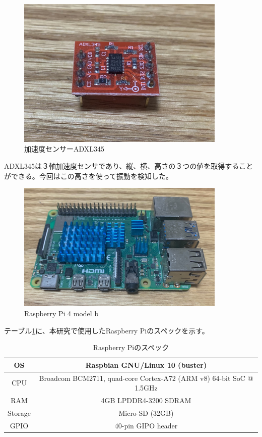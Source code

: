 \begin{figure}[htbp]
  \caption{加速度センサーADXL345}
  \label{fig:adxl345}
  \begin{center}
    \includegraphics[bb=0 0 1300 1000,width=10cm]{assets/adxl345.jpg}
  \end{center}
\end{figure}

ADXL345は３軸加速度センサであり、縦、横、高さの３つの値を取得することができる。今回はこの高さを使って振動を検知した。

\begin{figure}[htbp]
  \caption{Raspberry Pi 4 model b}
  \label{fig:raspi4_model_b}
  \begin{center}
    \includegraphics[bb=0 0 1300 1100,width=10cm]{assets/raspi4_model_b.jpg}
  \end{center}
\end{figure}

テーブル\ref{tb:raspberry_pi_spec}に、本研究で使用したRaspberry Piのスペックを示す。

\begin{table}[htbp]
  \caption{Raspberry Piのスペック}
  \label{tb:raspberry_pi_spec}
  \begin{center}
    \begin{tabular}{|c||c|}
      \hline
      OS  & Raspbian GNU/Linux 10 (buster) \\\hline
      CPU & Broadcom BCM2711, quad-core Cortex-A72 (ARM v8) 64-bit SoC @ 1.5GHz \\\hline
      RAM & 4GB LPDDR4-3200 SDRAM \\\hline
      Storage & Micro-SD (32GB) \\\hline
      GPIO & 40-pin GIPO header \\\hline
    \end{tabular}
  \end{center}
\end{table}

